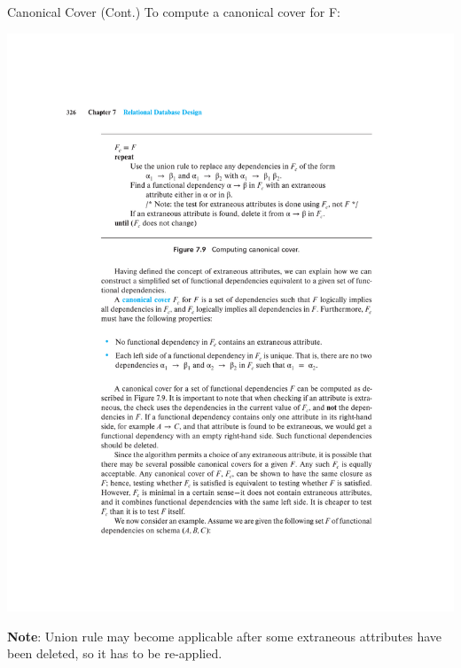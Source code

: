\documentclass{beamer}
\begin{document}
\begin{frame}{Canonical Cover (Cont.)}
    To compute a canonical cover for F:
    \begin{center}
        \includegraphics[width=\textwidth, trim={3.5cm 17cm 3.5cm 4.5cm}, clip]{figures/p326_Canonical}
    \end{center}
    \textbf{Note}: Union rule may become applicable after some extraneous attributes have been deleted, so it has to be re-applied.
\end{frame}
\end{document}
